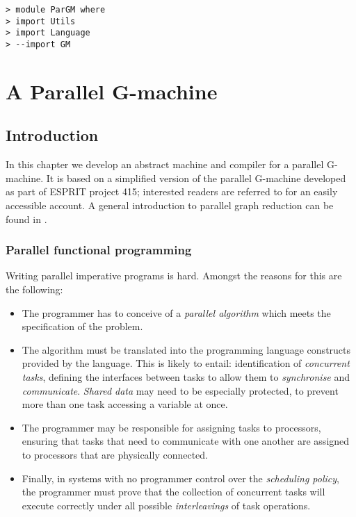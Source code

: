 \begin{verbatim}
> module ParGM where
> import Utils
> import Language
> --import GM
\end{verbatim}
%
%
%
\chapter{A Parallel G-machine}
\label{sect:par-g-machine}

\section{Introduction}

In this chapter we develop an abstract machine and compiler for a
parallel G-machine. It is based on a simplified version of the
parallel G-machine developed as part of ESPRIT project 415; interested
readers are referred to \cite{HDG-machine} for an easily accessible
account.  A general introduction to parallel graph reduction can be
found in \cite{PJ:CJoverview}.

\subsection{Parallel functional programming}

Writing parallel imperative programs is hard. Amongst the reasons for
this are the following:
\begin{itemize}

\item The programmer has to conceive of a {\em parallel
algorithm\/} which meets the specification of
the problem.

\item The algorithm must be translated into the programming language
constructs provided by the language. This is likely to entail:
identification of {\em concurrent tasks},
defining the interfaces between tasks to allow them to {\em
synchronise\/} and {\em
communicate}. {\em Shared data\/}
may need to be especially protected, to prevent more than one task
accessing a variable at once.

\item The programmer may be responsible for assigning tasks to
processors, ensuring that tasks that need to communicate with one
another are assigned to processors that are physically connected.

\item Finally, in systems with no programmer control over the {\em
scheduling policy}, the programmer must prove
that the collection of concurrent tasks will execute correctly under
all possible {\em interleavings\/} of task
operations.

\end{itemize}

